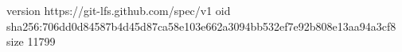 version https://git-lfs.github.com/spec/v1
oid sha256:706dd0d84587b4d45d87ca58e103e662a3094bb532ef7e92b808e13aa94a3cf8
size 11799
